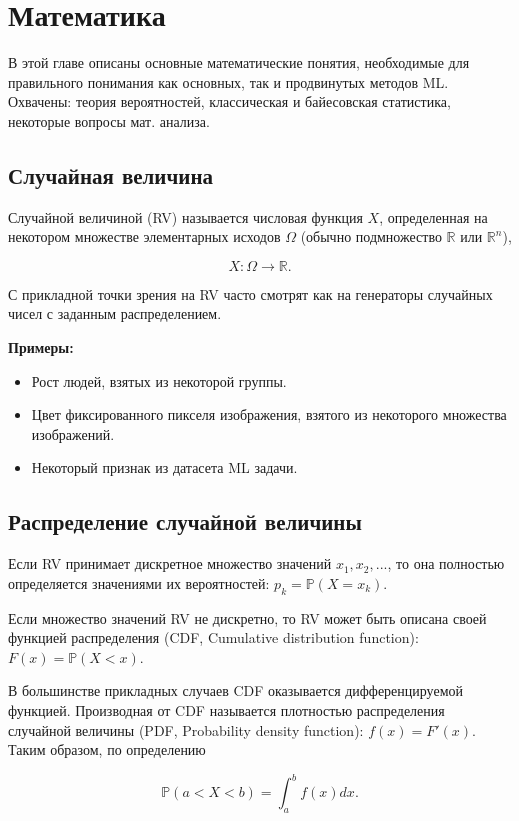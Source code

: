 \chapter{Математика}

В этой главе описаны основные математические понятия, необходимые для правильного понимания как основных, так и продвинутых методов ML. Охвачены: теория вероятностей, классическая и байесовская статистика, некоторые вопросы мат. анализа.


\section{Случайная величина}

Случайной величиной (RV) называется числовая функция $X$, определенная на некотором множестве элементарных исходов $\Omega$ (обычно подмножество $\mathbb{R}$ или $\mathbb{R}^n$), 

$$
X: \Omega\rightarrow\mathbb{R}.
$$

С прикладной точки зрения на RV часто смотрят как на генераторы случайных чисел с заданным распределением.

\textbf{Примеры:}
\begin{itemize}
    \item Рост людей, взятых из некоторой группы.
    \item Цвет фиксированного пикселя изображения, взятого из некоторого множества изображений.
    \item Некоторый признак из датасета ML задачи.
\end{itemize}


\section{Распределение случайной величины}

Если RV принимает дискретное множество значений $x_1,x_2,...$, то она полностью определяется значениями их вероятностей: $p_k=\mathbb{P}(X=x_k)$.

Если множество значений RV не дискретно, то RV может быть описана своей функцией распределения (CDF, Cumulative distribution function): $F(x)=\mathbb{P}(X<x)$.

В большинстве прикладных случаев CDF оказывается дифференцируемой функцией. Производная от CDF называется плотностью распределения случайной величины (PDF, Probability density function): $f(x)=F'(x)$. Таким образом, по определению 

$$
\mathbb{P}(a<X<b)=\int_{a}^{b}f(x)dx.
$$


